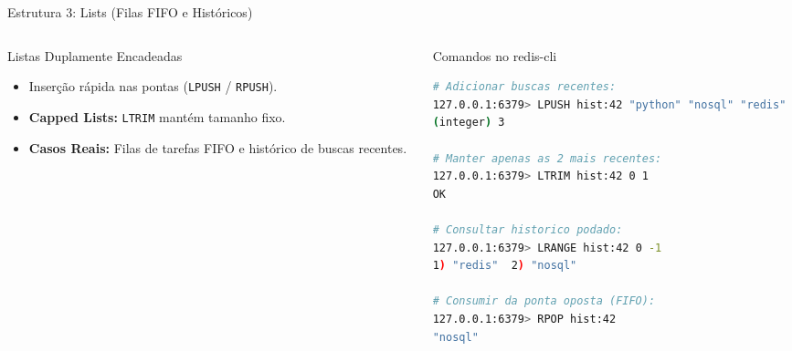 \begin{frame}[fragile]{Estrutura 3: Lists (Filas FIFO e Históricos)}
  \begin{columns}[T]
    \begin{column}{0.48\textwidth}
      \alert{Listas Duplamente Encadeadas}\par
      \small
      \begin{itemize}
        \item Inserção rápida nas pontas (\texttt{LPUSH} / \texttt{RPUSH}).
        \item \textbf{Capped Lists:} \texttt{LTRIM} mantém tamanho fixo.
        \item \textbf{Casos Reais:} Filas de tarefas FIFO e histórico de buscas recentes.
      \end{itemize}
    \end{column}
    \begin{column}{0.50\textwidth}
      \alert{Comandos no redis-cli}\par
      \begin{lstlisting}[language=bash]
# Adicionar buscas recentes:
127.0.0.1:6379> LPUSH hist:42 "python" "nosql" "redis"
(integer) 3

# Manter apenas as 2 mais recentes:
127.0.0.1:6379> LTRIM hist:42 0 1
OK

# Consultar historico podado:
127.0.0.1:6379> LRANGE hist:42 0 -1
1) "redis"  2) "nosql"

# Consumir da ponta oposta (FIFO):
127.0.0.1:6379> RPOP hist:42
"nosql"
      \end{lstlisting}
    \end{column}
  \end{columns}
\end{frame}

